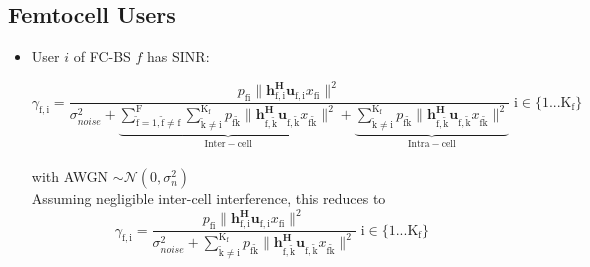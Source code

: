 \documentclass[12pt,a4paper]{report}
\begin{document}
\subsection{Femtocell Users}
\begin{itemize}



\item User $i$ of FC-BS $f$ has SINR:

	\begin{equation*}
	\gamma_{\mathrm{f,i}} = 
	\frac{p_{\mathrm{fi}}\|\mathbf{h^H_{\mathrm{f,i}}u_{\mathrm{f,i}}}x_{\mathrm{fi}}\|^2}
	{\sigma^2_{noise}   +
	\underbrace{
	\sum_{\mathrm{\tilde{f}=1,\tilde{f} \neq f}}^{\mathrm{F}}
	\sum_{\mathrm{\tilde{k}\neq i}}^{\mathrm{K_f}}
	  p_{\mathrm{f\tilde{k}}}\|\mathbf{h^H_{\mathrm{f,\tilde{k}}}u_{\mathrm{f,\tilde{k}}}}x_{\mathrm{f\tilde{k}}}\|^2}_
	  {\mathrm{Inter-cell}}+ \underbrace{
	\sum_{\mathrm{\tilde{k}\neq i}}^{\mathrm{K_f}}
	  p_{\mathrm{f\tilde{k}}}\|\mathbf{h^H_{\mathrm{f,\tilde{k}}}u_{\mathrm{f,\tilde{k}}}}x_{\mathrm{f\tilde{k}}}\|^2}
	 _{\mathrm{Intra-cell}}}
	  \; \mathrm{i \in \{1 ... K_f\}}\end{equation*}
\\
with AWGN $\sim \mathcal{N}(0,\sigma^2_n)$
\\

Assuming negligible inter-cell interference, this reduces to
	\begin{equation*}
	\gamma_{\mathrm{f,i}} = \frac{p_{\mathrm{fi}}\|\mathbf{h^H_{\mathrm{f,i}}
	u_{\mathrm{f,i}}}x_{\mathrm{fi}}\|^2}
	{\sigma^2_{noise} 
	 + \sum_{\mathrm{\tilde{k}\neq i}}^{\mathrm{K_f}}
	  p_{\mathrm{f\tilde{k}}}\|\mathbf{h^H_{\mathrm{f,\tilde{k}}}u_{\mathrm{f,\tilde{k}}}}x_{\mathrm{f\tilde{k}}}\|^2}
	  \; \mathrm{i \in \{1 ... K_f\}}
	\end{equation*}
\\

%

\end{itemize}
\end{document}

